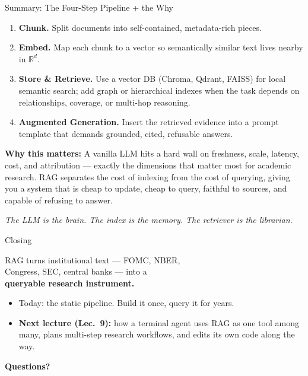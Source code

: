 \begin{frame}{Summary: The Four-Step Pipeline + the Why}
\begin{enumerate}
\item \textbf{Chunk.} Split documents into self-contained, metadata-rich pieces.

\medskip
\item \textbf{Embed.} Map each chunk to a vector so semantically similar text lives nearby in $\mathbb{R}^d$.

\medskip
\item \textbf{Store \& Retrieve.} Use a vector DB (Chroma, Qdrant, FAISS) for local semantic search; add graph or hierarchical indexes when the task depends on relationships, coverage, or multi-hop reasoning.

\medskip
\item \textbf{Augmented Generation.} Insert the retrieved evidence into a prompt template that demands grounded, cited, refusable answers.
\end{enumerate}

\bigskip
\textbf{Why this matters:} A vanilla LLM hits a hard wall on freshness, scale, latency, cost, and attribution --- exactly the dimensions that matter most for academic research. RAG separates the cost of indexing from the cost of querying, giving you a system that is cheap to update, cheap to query, faithful to sources, and capable of refusing to answer.

\bigskip
\centering\emph{The LLM is the brain. The index is the memory. The retriever is the librarian.}
\end{frame}

\begin{frame}{Closing}
\begin{center}
\Large
RAG turns institutional text --- FOMC, NBER,\\
Congress, SEC, central banks --- into a\\
\textbf{queryable research instrument.}
\end{center}

\bigskip
\bigskip
\begin{itemize}
\item Today: the static pipeline. Build it once, query it for years.
\medskip
\item \textbf{Next lecture (Lec.\ 9):} how a terminal agent uses RAG as one tool among many, plans multi-step research workflows, and edits its own code along the way.
\end{itemize}

\bigskip
\centering\textbf{Questions?}
\end{frame}


